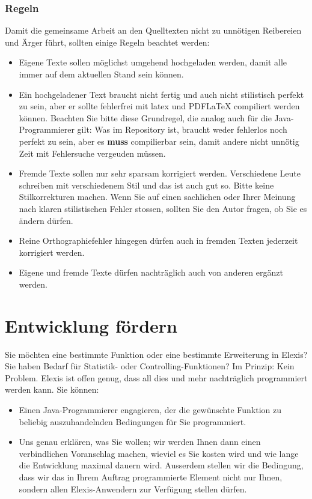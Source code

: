 \subsection{Regeln}
Damit die gemeinsame Arbeit an den Quelltexten nicht zu unnötigen Reibereien und
Ärger führt, sollten einige Regeln beachtet werden:
\begin{itemize}
  \item Eigene Texte sollen möglichst umgehend hochgeladen werden, damit alle
  immer auf dem aktuellen Stand sein können.
  \item Ein hochgeladener Text braucht nicht fertig und auch nicht stilistisch
  perfekt zu sein, aber er sollte fehlerfrei mit latex und PDFLaTeX compiliert
  werden können. Beachten Sie bitte diese Grundregel, die analog auch für die
  Java-Programmierer gilt: Was im Repository ist, braucht weder fehlerlos noch
  perfekt zu sein, aber es \textbf{muss} compilierbar sein, damit andere nicht
  unnötig Zeit mit Fehlersuche vergeuden müssen.
  \item Fremde Texte sollen nur sehr sparsam korrigiert werden. Verschiedene
  Leute schreiben mit verschiedenem Stil und das ist auch gut so. Bitte keine
  Stilkorrekturen machen. Wenn Sie auf einen sachlichen oder Ihrer Meinung nach
  klaren stilistischen Fehler stossen, sollten Sie den Autor fragen, ob Sie es
  ändern dürfen.
  \item Reine Orthographiefehler hingegen dürfen auch in fremden Texten
  jederzeit korrigiert werden.
  \item Eigene und fremde Texte dürfen nachträglich auch von anderen ergänzt
  werden.
\end{itemize}

\chapter{Entwicklung fördern}
Sie möchten eine bestimmte Funktion oder eine bestimmte Erweiterung in Elexis?
Sie haben Bedarf für Statistik- oder Controlling-Funktionen? Im Prinzip: Kein
Problem. Elexis ist offen genug, dass all dies und mehr nachträglich
programmiert werden kann. Sie können:
\begin{itemize}
  \item Einen Java-Programmierer engagieren, der die gewünschte Funktion zu
  beliebig auszuhandelnden Bedingungen für Sie programmiert.
  \item Uns genau erklären, was Sie wollen; wir werden Ihnen dann einen
  verbindlichen Voranschlag machen, wieviel es Sie kosten wird und wie
  lange die Entwicklung maximal dauern wird. Ausserdem stellen wir die
  Bedingung, dass wir das in Ihrem Auftrag programmierte Element nicht nur
  Ihnen, sondern allen Elexis-Anwendern zur Verfügung stellen dürfen.
\end{itemize}
